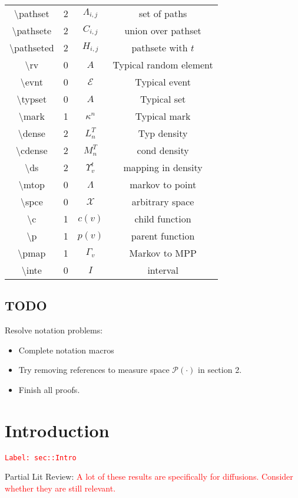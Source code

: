 \documentclass[12pt]{article}
\newcommand{\mc}{\mathcal}
\newcommand{\tr}{\textcolor{red}}
\newcommand{\labe}[1]{\tr{\texttt{Label: #1}}}
\newcommand{\tbs}{\textbackslash}
\newcommand{\pmsr}{\mc{P}}							%
\renewcommand{\v}{v}							%
\newcommand{\T}{T}								%
\renewcommand{\t}{t}							%
\newcommand{\itt}{i}								%
\newcommand{\ittt}{j}								%
\newcommand{\numb}{n}								%
\newcommand{\pathset}[2]{\Lambda_{#1,#2}}			%
\newcommand{\pathsete}[2]{C_{#1,#2}}			%
\newcommand{\pathseted}[2]{H_{#1,#2}}			%
\newcommand{\rv}{A}								%
\newcommand{\evnt}{\mc{E}}						%
\newcommand{\typset}{A}							%
\renewcommand{\mark}[1]{\kappa^{#1}}				%
\newcommand{\dense}[2]{L_{#1}^{#2}}				%
\newcommand{\cdense}[2]{M_{#1}^{#2}}			%
\newcommand{\ds}[2]{\Upsilon_{#1}^{#2}}			%
\newcommand{\mtop}{\Lambda}						%
\newcommand{\spce}{\mc{X}}						%
\renewcommand{\c}[1]{c(#1)}						%
\newcommand{\p}[1]{p(#1)}						%
\newcommand{\pmap}[1]{\Gamma_{#1}}				%
\newcommand{\inte}{I}							%
\begin{document}
\begin{longtable}{c|c|c|c}
\tbs pathset&2&\(\pathset{\itt}{\ittt}\)	&set of paths\\
\tbs pathsete&2&\(\pathsete{\itt}{\ittt}\)	&union over pathset\\
\tbs pathseted&2&\(\pathseted{\itt}{\ittt}\)&pathsete with \(\t\)\\
\tbs rv&0& \(\rv\)							&Typical random element\\
\tbs evnt&0&\(\evnt\)						&Typical event\\
\tbs typset&0&\(\typset\)					&Typical set\\
\tbs mark&1&\(\mark{\numb}\)				&Typical mark\\
\tbs dense&2& \(\dense{\numb}{\T}\)			&Typ density\\
\tbs cdense&2&\(\cdense{\numb}{\T}\)		&cond density\\
\tbs ds&2& \(\ds{\v}{\t}\)					&mapping in density\\
\tbs mtop &0& \(\mtop\)						&markov to point\\
\tbs spce &0&\(\spce\)						&arbitrary space\\
\tbs c &1& \(\c{\v}\)						&child function\\
\tbs p &1& \(\p{\v}\)						&parent function \\
\tbs pmap &1& \(\pmap{\v}\)					&Markov to MPP\\
\tbs inte &0& \(\inte\)						&interval
\end{longtable}

\subsection*{TODO}

Resolve notation problems:

\begin{itemize}
\item Complete notation macros

\item Try removing references to measure space \(\pmsr(\cdot)\) in section 2.

\item Finish all proofs.
\end{itemize}

\section{Introduction}
\label{sec::Intro}\labe{sec::Intro}

Partial Lit Review: \tr{A lot of these results are specifically for diffusions. Consider whether they are still relevant.}
\end{document}
